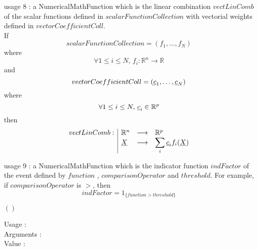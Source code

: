 \begin{description}
\begin{description}
  \item usage 8 :   a NumericalMathFunction which is the linear combination $vectLinComb$ of the scalar functions defined in  $scalarFunctionCollection$ with vectorial weights defined in $vectorCoefficientColl$. \\
If
    $$
    scalarFunctionCollection = (f_1, \hdots, f_N)
    $$
    where
    $$
    \forall 1 \leq i \leq N, \,     f_i : \mathbb{R}^n \longrightarrow \mathbb{R}
    $$
    and
    $$
    vectorCoefficientColl = ({\underline{c}}_1, \hdots, {\underline{c}}_N)
    $$
    where 
    $$
    \forall 1 \leq i \leq N, \,   {\underline{c}}_i \in \mathbb{R}^p
    $$
    then
    $$
    \begin{array}{l|lcl}
    vectLinComb : & \mathbb{R}^n & \longrightarrow & \mathbb{R}^{p} \\
              &  {\underline{X}} & \longrightarrow & \displaystyle \sum_i {\underline{c}}_if_i ({\underline{X}})
    \end{array}
    $$

  \item usage 9 :   a NumericalMathFunction which is the indicator function $indFactor$ of the event defined by $function$ , $comparisonOperator$ and $threshold$. For example, if $comparisonOperator$ is $>$, then
    $$
    indFactor = 1_{\{function > threshold\}}
    $$
  \end{description}

\item[Some methods :]  \rule{0pt}{1em}
  \begin{description}

  \item $()$
    \begin{description}
    \item[Usage :]  \rule{0pt}{1em}
    \item[Arguments :] \rule{0pt}{1em}
    \item[Value :] \rule{0pt}{1em}
    \end{description}
    \bigskip


\end{description}
\end{description}
